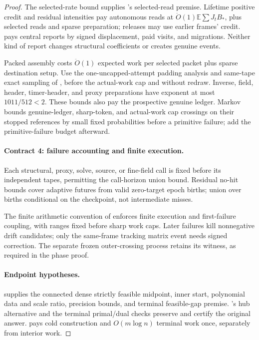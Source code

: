 \documentclass[11pt]{article}
\theoremstyle{remark}
\newcommand{\Ex}{\mathbb E}
\renewcommand{\O}{\ddot{O}}
\begin{document}
\begin{proof}
The selected-rate bound supplies 's selected-read
premise.
Lifetime positive credit and residual intensities pay autonomous reads at
$\O(1)\Ex\sum J_tB_*$, plus selected reads and sparse preparation;
releases may use earlier frames' credit.
 pays central reports by signed displacement,
paid visits, and migrations.
Neither kind of report changes structural coefficients or creates genuine
events.

Packed assembly costs $\O(1)$ expected work per selected packet plus sparse
destination setup.
Use the one-uncapped-attempt padding analysis and same-tape exact sampling of
, before the actual-work cap and without redraw.
Inverse, field, header, timer-header, and proxy preparations have exponent at
most $1011/512<2$.
These bounds also pay the prospective genuine ledger.
Markov bounds genuine-ledger, sharp-token, and actual-work cap crossings on
their stopped references by small fixed probabilities before a primitive
failure; add the primitive-failure budget afterward.

\paragraph{Contract 4: failure accounting and finite execution.}
Each structural, proxy, solve, source, or fine-field call is fixed before its
independent tapes, permitting the call-horizon union bound.
Residual no-hit bounds cover adaptive futures from valid zero-target epoch
births; union over births conditional on the checkpoint, not intermediate
misses.

The finite arithmetic convention of 
enforces finite execution and first-failure coupling, with ranges fixed before
sharp work caps.
Later failures kill nonnegative drift candidates; only the same-frame tracking
matrix event needs signed correction.
The separate frozen outer-crossing process retains its witness, as required in
the phase proof.

\paragraph{Endpoint hypotheses.}
 supplies the connected dense strictly feasible
midpoint, inner start, polynomial data and scale ratio, precision bounds, and
terminal feasible-gap premise.
's hub alternative and the terminal primal/dual checks
preserve and certify the original answer.
 pays cold construction and $O(m\log n)$ terminal work
once, separately from interior work.
\end{proof}
\end{document}
